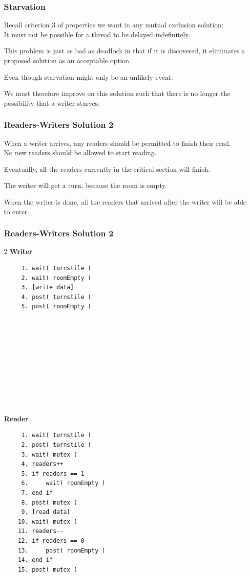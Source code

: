 \begin{frame}
	\frametitle{Starvation}

	Recall criterion 3 of properties we want in any mutual exclusion solution:\\
	\quad It must not be possible for a thread to be delayed indefinitely.

	This problem is just as bad as deadlock in that if it is discovered, it eliminates a proposed solution as an acceptable option.

	Even though starvation might only be an unlikely event.

	We must therefore improve on this solution such that there is no longer the possibility that a writer starves.


\end{frame}


\begin{frame}
	\frametitle{Readers-Writers Solution 2}

	When a writer arrives, any readers should be permitted to finish their read.\\
	\quad No new readers should be allowed to start reading.

	Eventually, all the readers currently in the critical section will finish.

	The writer will get a turn, because the room is empty.

	When the writer is done, all the readers that arrived after the writer will be able to enter.

\end{frame}

\begin{frame}[fragile]
	\frametitle{Readers-Writers Solution 2}
	\begin{multicols}{2}
		\textbf{Writer}
		\begin{verbatim}
	 1. wait( turnstile )
	 2. wait( roomEmpty )
	 3. [write data]
	 4. post( turnstile )
	 5. post( roomEmpty )
	 
	 
	 
	 
	 
	 
	 
	 
	 
	 
  \end{verbatim}
		\columnbreak
		\textbf{Reader}
		\begin{verbatim}
	 1. wait( turnstile )
	 2. post( turnstile )
	 3. wait( mutex )
	 4. readers++
	 5. if readers == 1
	 6.     wait( roomEmpty )
	 7. end if
	 8. post( mutex )
	 9. [read data]
	10. wait( mutex )
	11. readers--
	12. if readers == 0
	13.     post( roomEmpty )
	14. end if
	15. post( mutex )
  \end{verbatim}
	\end{multicols}

\end{frame}


